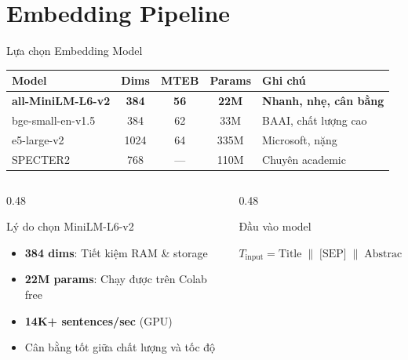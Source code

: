 \section{Embedding Pipeline}

\begin{frame}{Lựa chọn Embedding Model}
\centering
\renewcommand{\arraystretch}{1.05}
{\small
\begin{tabular}{l c c c l}
\toprule
\textbf{Model} & \textbf{Dims} & \textbf{MTEB} & \textbf{Params} & \textbf{Ghi chú} \\
\midrule
\rowcolor{highlightRow}
\textcolor{accentTeal}{\textbf{all-MiniLM-L6-v2}} & \textcolor{accentTeal}{\textbf{384}} & \textcolor{accentTeal}{\textbf{56}} & \textcolor{accentTeal}{\textbf{22M}} & \textcolor{accentTeal}{\textbf{Nhanh, nhẹ, cân bằng}} \\
bge-small-en-v1.5 & 384 & 62 & 33M & BAAI, chất lượng cao \\
e5-large-v2 & 1024 & 64 & 335M & Microsoft, nặng \\
SPECTER2 & 768 & --- & 110M & Chuyên academic \\
\bottomrule
\end{tabular}
}

\vspace{0.1cm}

\begin{columns}[T]
\begin{column}{0.48\textwidth}
\begin{exampleblock}{Lý do chọn MiniLM-L6-v2}
{\footnotesize
\begin{itemize}\itemsep0pt \parskip0pt 
    \item \textbf{384 dims}: Tiết kiệm RAM \& storage
    \item \textbf{22M params}: Chạy được trên Colab free
    \item \textbf{14K+ sentences/sec} (GPU)
    \item Cân bằng tốt giữa chất lượng và tốc độ
\end{itemize}
}
\end{exampleblock}
\end{column}
\begin{column}{0.48\textwidth}
\begin{block}{Đầu vào model}
{\footnotesize
$T_{\text{input}} = \text{Title} \;\|\; \text{[SEP]} \;\|\; \text{Abstract}$

}
\end{block}
\end{column}
\end{columns}
\end{frame}
